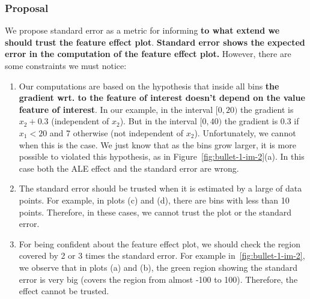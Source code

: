 \documentclass{article}
\begin{document}
\subsubsection*{Proposal}

We propose standard error as a metric for informing \textbf{to what extend
we should trust the feature effect plot}. \textbf{Standard error
  shows the expected error in the computation of the feature effect
  plot.} However, there are some constraints we must notice:

\begin{enumerate}
\item Our computations are based on the hypothesis that inside all
  bins \textbf{the gradient wrt. to the feature of interest doesn't
    depend on the value feature of interest}. In our example, in the
  interval \([0,20)\) the gradient is \(x_2 + 0.3\) (independent of
  \(x_2\)). But in the interval \([0,40)\) the gradient is 0.3 if
  \(x_1 < 20\) and 7 otherwise (not independent of
  \(x_2\)). Unfortunately, we cannot when this is the case. We just
  know that as the bins grow larger, it is more possible to violated
  this hypothesis, as in Figure~\ref{fig:bullet-1-im-2}(a). In this
  case both the ALE effect and the standard error are wrong.
\item The standard error should be trusted when it is estimated by a
  large of data points. For example, in plots (c) and (d), there are
  bins with less than 10 points. Therefore, in these cases, we cannot
  trust the plot or the standard error.
\item For being confident about the feature effect plot, we should
  check the region covered by 2 or 3 times the standard error. For
  example in~\ref{fig:bullet-1-im-2}, we observe that in plots (a) and
  (b), the green region showing the standard error is very big (covers
  the region from almost -100 to 100). Therefore, the effect cannot be
  trusted.
\end{enumerate}
\end{document}
